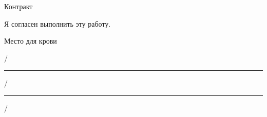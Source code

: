 \documentclass[12pt, a4paper]{article}
\begin{document}
\pagecolor{mycolor}
\pagestyle{empty} %

\begin{center}


{\fontsize{64}{1.33}\selectfont Контракт}

\vspace{8cm}
{\fontsize{14}{1.33}\selectfont Я согласен выполнить эту работу.}

\vspace{2cm}

\def\blob#1#2{\draw[fill=mycolor,rounded corners=#1*3mm, dashed] (#2) +($(0:#1*2+#1*rnd)$)
\foreach \a in {20,40,...,350} {  -- +($(\a: #1*2+#1*rnd)$) } -- cycle;} %

\vspace{1cm}

\footnotesize Место для крови

\vspace{5cm}

\hfill /\rule{14em}{0.5pt}/\rule{20em}{0.5pt}/

\hfill{}
\end{center}
\end{document}
